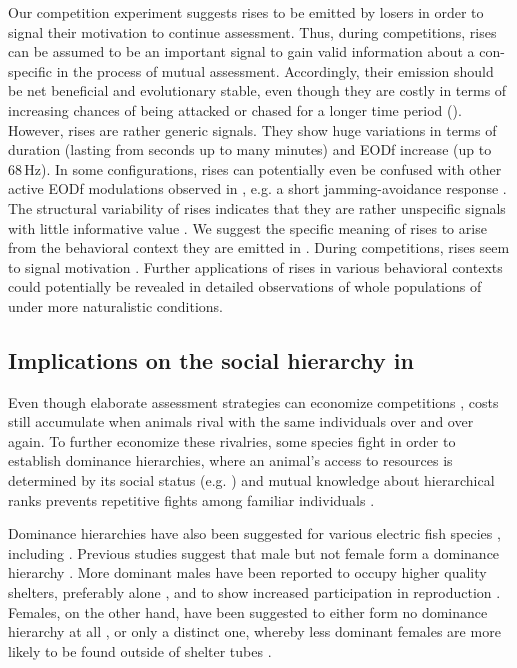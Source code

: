 Our competition experiment suggests rises to be emitted by losers in order to signal their motivation to continue assessment. Thus, during competitions, rises can be assumed to be an important signal to gain valid information about a con-specific in the process of mutual assessment. Accordingly, their emission should be net beneficial and evolutionary stable, even though they are costly in terms of increasing chances of being attacked or chased for a longer time period (). However, rises are rather generic signals. They show huge variations in terms of duration (lasting from seconds up to many minutes) and EODf increase (up to 68\,Hz). In some configurations, rises can potentially even be confused with other active EODf modulations observed in \lepto{}, e.g. a short jamming-avoidance response \citep{Tallarovic2005}. The structural variability of rises indicates that they are rather unspecific signals with little informative value \citep{Seyfarth2003}. We suggest the specific meaning of rises to arise from the behavioral context they are emitted in \citep{Seyfarth2003}. During competitions, rises seem to signal motivation \citep{Raab2021}. Further applications of rises in various behavioral contexts could potentially be revealed in detailed observations of whole populations of \lepto{} under more naturalistic conditions.

\subsection{Implications on the social hierarchy in \lepto{}}

Even though elaborate assessment strategies can economize competitions \citep{ArnottElwood2009}, costs still accumulate when animals rival with the same individuals over and over again. To further economize these rivalries, some species fight in order to establish dominance hierarchies, where an animal's access to resources is determined by its social status (e.g. \citealp{Wauters1992, Sapolsky2005, Taves2009}) and mutual knowledge about hierarchical ranks prevents repetitive fights among familiar individuals \citep{Cluttonbrock1979, Fernald2014, Cornhill2020}.

Dominance hierarchies have also been suggested for various electric fish species \citep{Westby1970, Fugere2011, Silva2012}, including \lepto{} \citep{Hagedorn1985, Dunlap2002, Stamper2010, Henninger2018}. Previous studies suggest that male but not female \lepto{} form a dominance hierarchy \citep{Hagedorn1985, Dunlap2002}. More dominant males have been reported to occupy higher quality shelters, preferably alone \citep{Dunlap2002}, and to show increased participation in reproduction \citep{Hagedorn1985, Henninger2018}. Females, on the other hand, have been suggested to either form no dominance hierarchy at all \citep{Hagedorn1985}, or only a distinct one, whereby less dominant females are more likely to be found outside of shelter tubes \citep{Dunlap2002}. 

